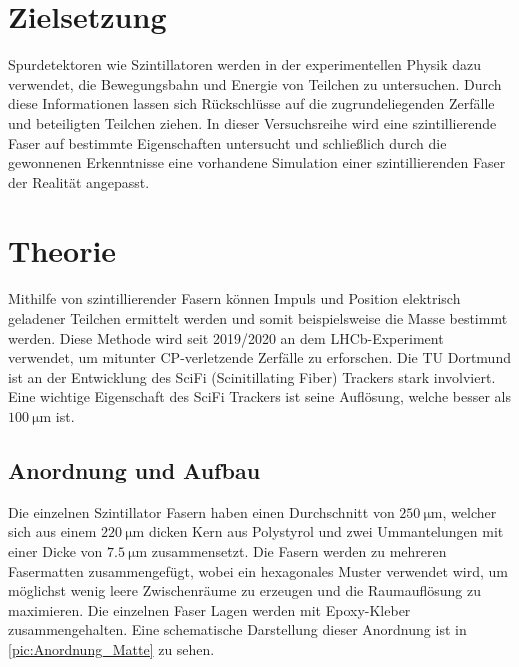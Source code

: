 \section{Zielsetzung}
\label{sec:Zielsetzung}

Spurdetektoren wie Szintillatoren werden in der experimentellen Physik dazu verwendet, die Bewegungsbahn und Energie
von Teilchen zu untersuchen. Durch diese Informationen lassen sich Rückschlüsse auf die zugrundeliegenden Zerfälle und
beteiligten Teilchen ziehen. In dieser Versuchsreihe wird eine szintillierende Faser auf bestimmte Eigenschaften
untersucht und schließlich durch die gewonnenen Erkenntnisse eine vorhandene Simulation einer szintillierenden Faser
der Realität angepasst.

\section{Theorie}
\label{sec:Theorie}

Mithilfe von szintillierender Fasern können Impuls und Position elektrisch geladener Teilchen ermittelt werden
und somit beispielsweise die Masse bestimmt werden. Diese Methode wird seit 2019/2020 an dem LHCb-Experiment 
verwendet, um mitunter CP-verletzende Zerfälle zu erforschen. Die TU Dortmund ist an der Entwicklung 
des SciFi (Scinitillating Fiber) Trackers stark involviert. Eine wichtige Eigenschaft des SciFi Trackers ist 
seine Auflösung, welche besser als $\qty{100}{\micro\metre}$\cite{SciFi_Versuch} ist.

\subsection{Anordnung und Aufbau}

Die einzelnen Szintillator Fasern haben einen Durchschnitt von $\qty{250}{\micro\metre}$, welcher sich aus einem
$\qty{220}{\micro\metre}$ dicken Kern aus Polystyrol und zwei Ummantelungen mit einer Dicke von $\qty{7.5}{\micro\metre}$
zusammensetzt. Die Fasern werden zu mehreren Fasermatten zusammengefügt, wobei ein hexagonales Muster
verwendet wird, um möglichst wenig leere Zwischenräume zu erzeugen und die Raumauflösung zu maximieren. Die einzelnen Faser Lagen
werden mit Epoxy-Kleber zusammengehalten. Eine schematische Darstellung dieser Anordnung ist in \autoref{pic:Anordnung_Matte} zu sehen.

